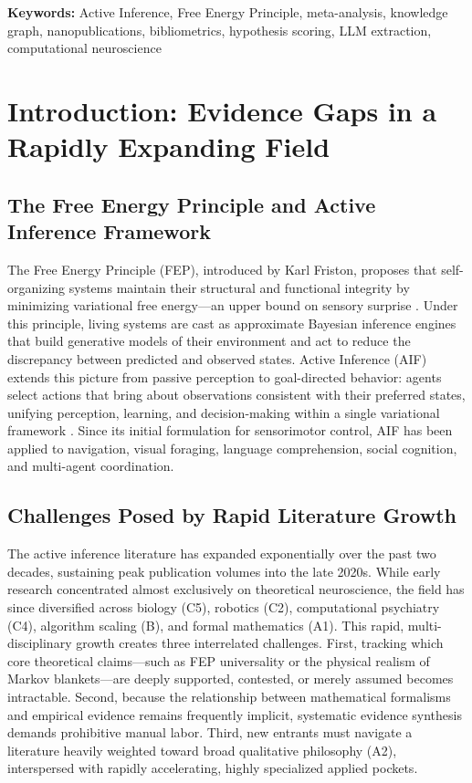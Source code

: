 \documentclass[
]{article}
\begin{document}
\textbf{Keywords:} Active Inference, Free Energy Principle,
meta-analysis, knowledge graph, nanopublications, bibliometrics,
hypothesis scoring, LLM extraction, computational neuroscience

\newpage

\section{Introduction: Evidence Gaps in a Rapidly Expanding
Field}\label{introduction-evidence-gaps-in-a-rapidly-expanding-field}

\subsection{The Free Energy Principle and Active Inference
Framework}\label{the-free-energy-principle-and-active-inference-framework}

The Free Energy Principle (FEP), introduced by Karl Friston, proposes
that self-organizing systems maintain their structural and functional
integrity by minimizing variational free energy---an upper bound on
sensory surprise \citep{friston2006free, friston2010free}. Under this
principle, living systems are cast as approximate Bayesian inference
engines that build generative models of their environment and act to
reduce the discrepancy between predicted and observed states. Active
Inference (AIF) extends this picture from passive perception to
goal-directed behavior: agents select actions that bring about
observations consistent with their preferred states, unifying
perception, learning, and decision-making within a single variational
framework \citep{parr2022active, friston2017active}. Since its initial
formulation for sensorimotor control, AIF has been applied to
navigation, visual foraging, language comprehension, social cognition,
and multi-agent coordination.

\subsection{Challenges Posed by Rapid Literature
Growth}\label{challenges-posed-by-rapid-literature-growth}

The active inference literature has expanded exponentially over the past
two decades, sustaining peak publication volumes into the late 2020s.
While early research concentrated almost exclusively on theoretical
neuroscience, the field has since diversified across biology (C5),
robotics (C2), computational psychiatry (C4), algorithm scaling (B), and
formal mathematics (A1). This rapid, multi-disciplinary growth creates
three interrelated challenges. First, tracking which core theoretical
claims---such as FEP universality or the physical realism of Markov
blankets---are deeply supported, contested, or merely assumed becomes
intractable. Second, because the relationship between mathematical
formalisms and empirical evidence remains frequently implicit,
systematic evidence synthesis demands prohibitive manual labor. Third,
new entrants must navigate a literature heavily weighted toward broad
qualitative philosophy (A2), interspersed with rapidly accelerating,
highly specialized applied pockets.
\end{document}
